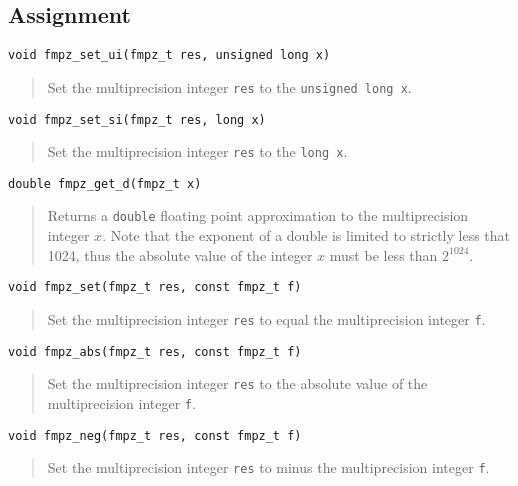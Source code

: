 \documentclass[a4paper,10pt]{article}
\newcommand{\code}{\lstinline}
\begin{document}
\subsection{Assignment}

\begin{lstlisting}
void fmpz_set_ui(fmpz_t res, unsigned long x)
\end{lstlisting}
\begin{quote}
Set the multiprecision integer \code{res} to the \code{unsigned long x}.
\end{quote}

\begin{lstlisting}
void fmpz_set_si(fmpz_t res, long x)
\end{lstlisting}
\begin{quote}
Set the multiprecision integer \code{res} to the \code{long x}.
\end{quote}

\begin{lstlisting}
double fmpz_get_d(fmpz_t x) 
\end{lstlisting}
\begin{quote}
Returns a \code{double} floating point approximation to the multiprecision integer $x$. Note that the exponent of a double is limited to strictly less that 1024, thus the absolute value of the integer $x$ must be less than $2^{1024}$.
\end{quote}

\begin{lstlisting}
void fmpz_set(fmpz_t res, const fmpz_t f)
\end{lstlisting}
\begin{quote}
Set the multiprecision integer \code{res} to equal the multiprecision integer \code{f}.
\end{quote}

\begin{lstlisting}
void fmpz_abs(fmpz_t res, const fmpz_t f)
\end{lstlisting}
\begin{quote}
Set the multiprecision integer \code{res} to the absolute value of the multiprecision integer \code{f}.
\end{quote}

\begin{lstlisting}
void fmpz_neg(fmpz_t res, const fmpz_t f)
\end{lstlisting}
\begin{quote}
Set the multiprecision integer \code{res} to minus the multiprecision integer \code{f}.
\end{quote}
\end{document}
